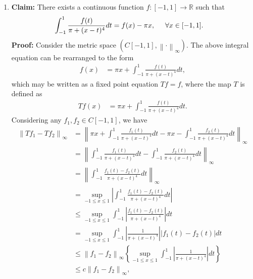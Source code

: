 \documentclass[a4paper,11pt]{article}
\newcommand{\norm}[1]{\left\lVert#1\right\rVert}
\newcommand{\ds}{\displaystyle}
\begin{document}
{{\begin{enumerate}[leftmargin=*]
			\textbf{Claim:} $\ds{\text{Cl}(S) = \text{Bd}(S) = \{\{x_n\}_{n=1}^{\infty} \in \ell^1 : |x_n| \leq \nicefrac{1}{n}, \: \forall n\}}$.
			\bigbreak
			\textbf{Proof:} By definition, $\ds{\text{Cl}(S) = \text{Int}(S) \sqcup \text{Bd}(S) = \text{Bd}(S)}$ as $\ds{\text{Int}(S) = \emptyset}$.
				\bigbreak
		\item \textbf{Claim:} There exists a continuous function $\ds{f:[-1,1] \rightarrow \mathbb{R}}$ such that 
			\begin{align*}
				\int_{-1}^1 \frac{f(t)}{\pi + (x-t)^4}dt & = f(x) - \pi x, \hspace{5mm} \forall x \in [-1,1].
			\end{align*}
			\bigbreak
			\textbf{Proof:} Consider the metric space $\ds{\left(C[-1,1],\norm{\cdot}_{\infty}\right)}$. The above integral equation can be rearranged to the form 
			\begin{align*}
				f(x) & = \pi x + \int_{-1}^1 \frac{f(t)}{\pi + (x-t)^4}dt,
			\end{align*}
			which may be written as a fixed point equation $\ds{Tf = f}$, where the map $\ds{T}$ is defined as 
			\begin{align*}
				Tf(x) & = \pi x + \int_{-1}^1 \frac{f(t)}{\pi + (x-t)^4}dt.
			\end{align*}
			Considering any $\ds{f_1,f_2 \in C[-1,1]}$, we have
			\begin{align*}
				\norm{Tf_1 - Tf_2}_{\infty} & = \norm{\pi x + \int_{-1}^1 \frac{f_1(t)}{\pi + (x-t)^4}dt - \pi x - \int_{-1}^1 \frac{f_2(t)}{\pi + (x-t)^4}dt}_{\infty}\\
											& = \norm{\int_{-1}^1 \frac{f_1(t)}{\pi + (x-t)^4}dt - \int_{-1}^1 \frac{f_2(t)}{\pi + (x-t)^4}dt}_{\infty}\\
											& = \norm{\int_{-1}^1 \frac{f_1(t) - f_2(t)}{\pi + (x-t)^4}dt}_{\infty}\\
											& = \sup_{-1\leq x\leq 1}{\left|\int_{-1}^1 \frac{f_1(t) - f_2(t)}{\pi + (x-t)^4}dt\right|}\\
											& \leq \sup_{-1\leq x\leq 1}{\int_{-1}^1 \left|\frac{f_1(t) - f_2(t)}{\pi + (x-t)^4}\right|dt}\\
											& = \sup_{-1\leq x\leq 1}{\int_{-1}^1 \left|\frac{1}{\pi + (x-t)^4}\right||f_1(t) - f_2(t)|dt}\\
											& \leq \norm{f_1 - f_2}_{\infty} \left\{\sup_{-1\leq x\leq 1}{\int_{-1}^1 \left|\frac{1}{\pi + (x-t)^4}\right|dt}\right\}\\
											& \leq c\norm{f_1 - f_2}_{\infty},
			\end{align*}

\end{enumerate}}}
\end{document}
